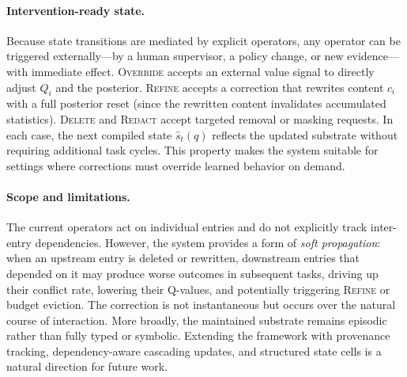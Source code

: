 \paragraph{Intervention-ready state.}
Because state transitions are mediated by explicit operators, any operator can be triggered externally---by a human supervisor, a policy change, or new evidence---with immediate effect. \textsc{Override} accepts an external value signal to directly adjust $Q_i$ and the posterior. \textsc{Refine} accepts a correction that rewrites content $c_i$ with a full posterior reset (since the rewritten content invalidates accumulated statistics). \textsc{Delete} and \textsc{Redact} accept targeted removal or masking requests. In each case, the next compiled state $\hat{s}_{t}(q)$ reflects the updated substrate without requiring additional task cycles. This property makes the system suitable for settings where corrections must override learned behavior on demand.

\paragraph{Scope and limitations.}
The current operators act on individual entries and do not explicitly track inter-entry dependencies. However, the system provides a form of \emph{soft propagation}: when an upstream entry is deleted or rewritten, downstream entries that depended on it may produce worse outcomes in subsequent tasks, driving up their conflict rate, lowering their Q-values, and potentially triggering \textsc{Refine} or budget eviction. The correction is not instantaneous but occurs over the natural course of interaction. More broadly, the maintained substrate remains episodic rather than fully typed or symbolic. Extending the framework with provenance tracking, dependency-aware cascading updates, and structured state cells is a natural direction for future work.
